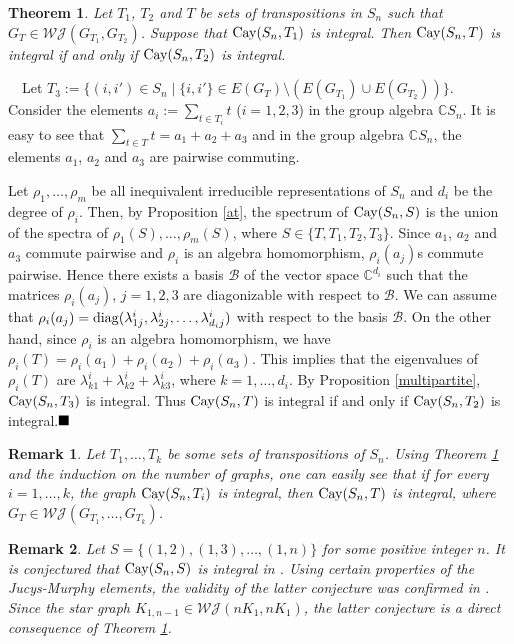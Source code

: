 \documentclass[12pt,a4paper]{article}
\newtheorem{theorem}{\bf Theorem}%
\newtheorem{remark}{\bf Remark}
\renewcommand{\proof}{\noindent{\it\textbf{Proof.}}\ \ }
\newcommand{\diag}{{\rm diag}}
\newcommand{\Cay}{{\rm Cay}}
\newcommand{\eqd}{$\hfill \blacksquare$}
\begin{document}
\begin{theorem}\label{join}
Let $T_1$, $T_2$ and $T$  be  sets of transpositions in $S_n$ such that $G_T\in \mathcal{WJ}(G_{T_1}, G_{T_2})$. Suppose that $\Cay(S_n,T_1)$ is integral. Then $\Cay(S_n,T)$ is integral if and only if $\Cay(S_n,T_2)$ is integral.
\end{theorem}
\proof Let $T_3:=\{(i,i') \in S_n \mid \{i,i'\}\in E(G_T)\setminus (E(G_{T_1})\cup E(G_{T_2}))\}$. Consider the elements $a_i:=\sum_{t\in T_i} t$ ($i=1,2,3$)  in the group algebra $\mathbb{C}S_n$. It is easy to see that $\sum_{t\in T} t = a_1+a_2+a_3$ and in the group algebra $\mathbb{C}S_n$, the elements $a_1$, $a_2$ and $a_3$ are pairwise commuting.


Let $\rho_1,\dots, \rho_m$ be all inequivalent irreducible representations of $S_n$ and $d_i$ be the degree of $\rho_i$. Then, by Proposition \ref{at}, the spectrum of $\Cay(S_n,S)$ is the union of the spectra of $\rho_1(S),\dots,\rho_m(S)$, where $S\in\{T,T_1,T_2,T_3\}$.  Since $a_1$, $a_2$ and $a_3$ commute pairwise and $\rho_i$ is an algebra homomorphism, $\rho_i(a_j)$s commute pairwise. Hence there exists a basis $\mathcal{B}$ of the vector space $\mathbb{C}^{d_i}$ such that
the matrices $\rho_i(a_j)$, $j=1,2,3$ are diagonizable with respect to $\mathcal{B}$. We can assume that 
$\rho_i(a_j)=\diag(\lambda^i_{1j},\lambda^i_{2j},\dots,\lambda^i_{d_{i}j})$ with respect to the basis $\mathcal{B}$. On the other hand, since $\rho_i$ is an algebra homomorphism, we have $\rho_i(T)=\rho_i(a_1)+\rho_i(a_2)+\rho_i(a_3)$. This implies that the eigenvalues of  $\rho_i(T)$ are $\lambda^i_{k1}+\lambda^i_{k2}+\lambda^i_{k3}$, where $k=1,\dots,d_i$. By Proposition \ref{multipartite}, $\Cay(S_n, T_3)$ is integral. Thus $\Cay(S_n, T)$ is integral if and only if $\Cay(S_n,T_2)$ is integral.\eqd



\begin{remark}{\rm 
Let $T_1,\ldots,T_k$ be some sets of transpositions of $S_n$. Using Theorem \ref{join} and the induction on the number of graphs, one can easily see that if for every $i=1,\ldots,k$, the graph $\Cay(S_{n},T_i)$ is integral, then $\Cay(S_n,T)$ is integral, where $G_T\in \mathcal{WJ}(G_{T_1},\dots, G_{T_k})$.}
\end{remark}

\begin{remark}
{\rm Let $S=\{(1,2),(1,3),\ldots,(1,n)\}$ for some positive integer $n$. It is conjectured that
$\Cay(S_n,S)$ is integral in \cite{AV}. Using certain properties of the Jucys-Murphy elements, the validity of the latter conjecture was
confirmed  in \cite{CF}. Since the star graph $K_{1,n-1}\in \mathcal{WJ}(nK_1,nK_1)$, the latter conjecture is a direct consequence of Theorem \ref{join}.}
\end{remark}
\end{document}
